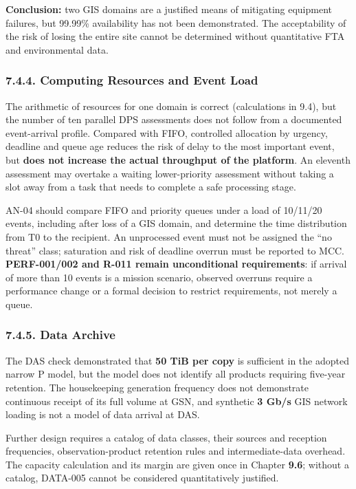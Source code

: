\textbf{Conclusion:} two GIS domains are a justified means of mitigating equipment failures, but 99.99\% availability has not been demonstrated. The acceptability of the risk of losing the entire site cannot be determined without quantitative FTA and environmental data.

\subsubsection{7.4.4. Computing Resources and Event Load}\label{ddjf-7-4-4}

The arithmetic of resources for one domain is correct (calculations in 9.4), but the number of ten parallel DPS assessments does not follow from a documented event-arrival profile. Compared with FIFO, controlled allocation by urgency, deadline and queue age reduces the risk of delay to the most important event, but \textbf{does not increase the actual throughput of the platform}. An eleventh assessment may overtake a waiting lower-priority assessment without taking a slot away from a task that needs to complete a safe processing stage.

AN-04 should compare FIFO and priority queues under a load of 10/\allowbreak{}11/\allowbreak{}20 events, including after loss of a GIS domain, and determine the time distribution from T0 to the recipient. An unprocessed event must not be assigned the “no threat” class; saturation and risk of deadline overrun must be reported to MCC. \textbf{PERF-001/\allowbreak{}002 and R-011 remain unconditional requirements}: if arrival of more than 10 events is a mission scenario, observed overruns require a performance change or a formal decision to restrict requirements, not merely a queue.

\subsubsection{7.4.5. Data Archive}\label{ddjf-7-4-5}

The DAS check demonstrated that \textbf{50 TiB per copy} is sufficient in the adopted narrow P model, but the model does not identify all products requiring five-year retention. The housekeeping generation frequency does not demonstrate continuous receipt of its full volume at GSN, and synthetic \textbf{3 Gb/\allowbreak{}s} GIS network loading is not a model of data arrival at DAS.

Further design requires a catalog of data classes, their sources and reception frequencies, observation-product retention rules and intermediate-data overhead. The capacity calculation and its margin are given once in Chapter \textbf{9.6}; without a catalog, DATA-005 cannot be considered quantitatively justified.

